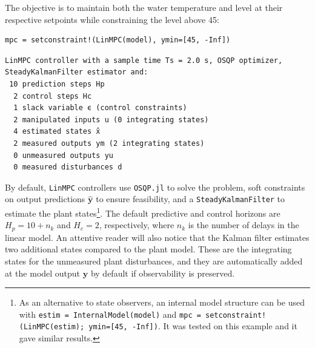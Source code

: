 The objective is to maintain both the water temperature and level at their respective setpoints while constraining the level above 45:
\begin{verbatim}
mpc = setconstraint!(LinMPC(model), ymin=[45, -Inf])
\end{verbatim}
\spacerepl
\begin{verbatim}
LinMPC controller with a sample time Ts = 2.0 s, OSQP optimizer,
SteadyKalmanFilter estimator and:
 10 prediction steps Hp
  2 control steps Hc
  1 slack variable ϵ (control constraints)
  2 manipulated inputs u (0 integrating states)
  4 estimated states x̂
  2 measured outputs ym (2 integrating states)
  0 unmeasured outputs yu
  0 measured disturbances d
\end{verbatim}
By default, \texttt{LinMPC} controllers use \texttt{OSQP.jl} \citep{osqp} to solve the problem, soft constraints on output predictions $\mathbf{\hat y}$ to ensure feasibility, and a \texttt{SteadyKalmanFilter} to estimate the plant states\footnote{As an alternative to state observers, an internal model structure can be used with \texttt{estim = InternalModel(model)} and \texttt{mpc = setconstraint!(LinMPC(estim); ymin=[45, -Inf])}. It was tested on this example and it gave similar results.}. The default predictive and control horizons are $H_p = 10 + n_k$ and $H_c = 2$, respectively, where $n_k$ is the number of delays in the linear model. An attentive reader will also notice that the Kalman filter estimates two additional states compared to the plant model. These are the integrating states for the unmeasured plant disturbances, and they are automatically added at the model output $\mathbf{y}$ by default if observability is preserved.

